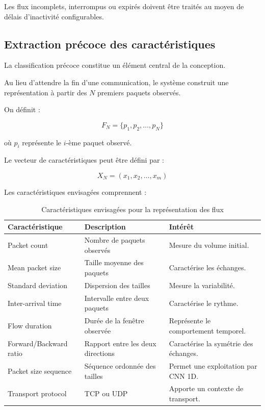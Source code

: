 Les flux incomplets, interrompus ou expirés doivent
être traités au moyen de délais d'inactivité configurables.

\subsection{Extraction précoce des caractéristiques}

La classification précoce constitue un élément central
de la conception.

Au lieu d'attendre la fin d'une communication, le système
construit une représentation à partir des $N$ premiers
paquets observés.

On définit :

\[
F_N=\{p_1,p_2,\ldots,p_N\}
\]

où $p_i$ représente le $i$-ème paquet observé.

Le vecteur de caractéristiques peut être défini par :

\[
X_N=(x_1,x_2,\ldots,x_m)
\]

Les caractéristiques envisagées comprennent :

\begin{table}[H]
\centering
\caption{Caractéristiques envisagées pour la représentation des flux}
\label{tab:features}
\begin{tabularx}{\textwidth}{|l|X|X|}
\hline
\textbf{Caractéristique} & \textbf{Description} &
\textbf{Intérêt} \\
\hline
Packet count &
Nombre de paquets observés &
Mesure du volume initial. \\
\hline
Mean packet size &
Taille moyenne des paquets &
Caractérise les échanges. \\
\hline
Standard deviation &
Dispersion des tailles &
Mesure la variabilité. \\
\hline
Inter-arrival time &
Intervalle entre deux paquets &
Caractérise le rythme. \\
\hline
Flow duration &
Durée de la fenêtre observée &
Représente le comportement temporel. \\
\hline
Forward/Backward ratio &
Rapport entre les deux directions &
Caractérise la symétrie des échanges. \\
\hline
Packet size sequence &
Séquence ordonnée des tailles &
Permet une exploitation par CNN 1D. \\
\hline
Transport protocol &
TCP ou UDP &
Apporte un contexte de transport. \\
\hline
\end{tabularx}
\end{table}

